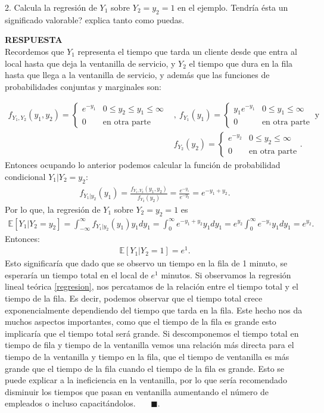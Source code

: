 \documentclass[11pt,letterpaper]{article}
\newcommand{\mE}{\mathbb{E}}
\newcommand{\res}{\textbf{RESPUESTA}\\}
\newcommand{\fin}{$\blacksquare.$}
\newcommand{\intim}{\int_{-\infty}^\infty}
\begin{document}
2. Calcula la regresión de $Y_1$ sobre $Y_2 = y_2 = 1$ en el ejemplo. Tendría ésta un significado valorable? explica tanto como puedas.

\res Recordemos que $Y_1$ representa el tiempo que tarda un cliente desde que entra al local hasta que deja la ventanilla de servicio, y $Y_2$ el tiempo que dura en la fila hasta que llega a la ventanilla de servicio, y además que las funciones de probabilidades conjuntas y marginales son:

\begin{align*}
f_{Y_1,Y_2}(y_1,y_2)=\left\{\begin{array}{cc}
e^{-y_1} & 0\leq y_2 \leq y_1 \leq \infty\\
0& \text{en otra parte}
\end{array} \right.&, \ f_{Y_1}(y_1)=\left\{\begin{array}{cc}
y_1 e^{-y_1} & 0\leq y_1\leq \infty\\
0& \text{en otra parte}
\end{array} \right. \ \text{y} \ \\
&f_{Y_2}(y_2)=\left\{\begin{array}{cc}
e^{-y_2} & 0\leq y_2 \leq \infty\\
0& \text{en otra parte}
\end{array} \right. .
\end{align*}
Entonces ocupando lo anterior podemos calcular la función de probabilidad condicional $Y_1|Y_2=y_2$:
\begin{align*}
f_{Y_1|y_2}(y_1)=\frac{f_{Y_1,Y_2}(y_1,y_2)}{f_{Y_2}(y_2)} =\frac{e^{-y_1}}{e^{-y_2}}=e^{-y_1+y_2}.
\end{align*}
Por lo que, la regresión de $Y_1$ sobre $Y_2 = y_2 = 1$ es
\begin{align} \label{regresion}
\mE[Y_1|Y_2=y_2]=\intim f_{Y_1|y_2}(y_1) y_1 dy_1=\int_0^\infty e^{-y_1+y_2}y_1dy_1=e^{y_2}\int_0^\infty e^{-y_1}y_1dy_1=e^{y_2}.
\end{align}
Entonces:
\begin{align*}
\mE[Y_1|Y_2=1]=e^1.
\end{align*}
Esto significaría que dado que se observo un tiempo en la fila de 1 minuto, se esperaría un tiempo total en el local de $e^{1}$ minutos. Si observamos la regresión lineal teórica \ref{regresion}, nos percatamos de la relación entre el tiempo total y el tiempo de la fila. Es decir, podemos observar que el tiempo total crece exponencialmente dependiendo del tiempo que tarda en la fila. Este hecho nos da muchos aspectos importantes, como que el tiempo de la fila es grande esto implicaría que el tiempo total será grande. Si descomponemos el tiempo total en tiempo de fila y tiempo de la ventanilla vemos una relación más directa para el tiempo de la ventanilla y tiempo en la fila, que el tiempo de ventanilla es más grande que el tiempo de la fila cuando el tiempo de la fila es grande. Esto se puede explicar a la ineficiencia en la ventanilla, por lo que sería recomendado disminuir los tiempos que pasan en ventanilla aumentando el número de empleados o incluso capacitándolos. \ \ \ \fin
\end{document}
